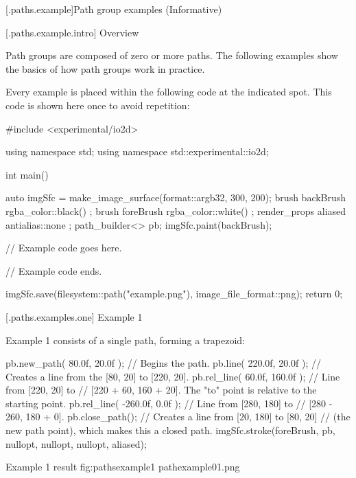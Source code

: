 

 [\iotwod.paths.example]{Path group examples (Informative)}

 [\iotwod.paths.example.intro] {Overview}

\pnum
Path groups are composed of zero or more paths. The following examples show the basics of how path groups work in practice.

\pnum
Every example is placed within the following code at the indicated spot. This code is shown here once to avoid repetition:

\begin{codeblock}
#include <experimental/io2d>

using namespace std;
using namespace std::experimental::io2d;

int main() {
  auto imgSfc = make_image_surface(format::argb32, 300, 200);
  brush backBrush{ rgba_color::black() };
  brush foreBrush{ rgba_color::white() };
  render_props aliased{ antialias::none };
  path_builder<> pb{};
  imgSfc.paint(backBrush);
  
  // Example code goes here.

  // Example code ends.
  
  imgSfc.save(filesystem::path("example.png"), image_file_format::png);
  return 0;
}
\end{codeblock}

 [\iotwod.paths.examples.one] {Example 1}

\pnum
Example 1 consists of a single path, forming a trapezoid:

\begin{codeblock}
  pb.new_path({ 80.0f, 20.0f }); // Begins the path.
  pb.line({ 220.0f, 20.0f }); // Creates a line from the [80, 20] to [220, 20].
  pb.rel_line({ 60.0f, 160.0f }); // Line from [220, 20] to
    // [220 + 60, 160 + 20]. The "to" point is relative to the starting point.
  pb.rel_line({ -260.0f, 0.0f }); // Line from [280, 180] to 
    // [280 - 260, 180 + 0].
  pb.close_path(); // Creates a line from [20, 180] to [80, 20] 
    // (the new path point), which makes this a closed path.
  imgSfc.stroke(foreBrush, pb, nullopt, nullopt, nullopt, aliased);
\end{codeblock}

\begin{importgraphiciotwod}
{Example 1 result}
{fig:pathsexample1}
{pathexample01.png}
\end{importgraphiciotwod}

